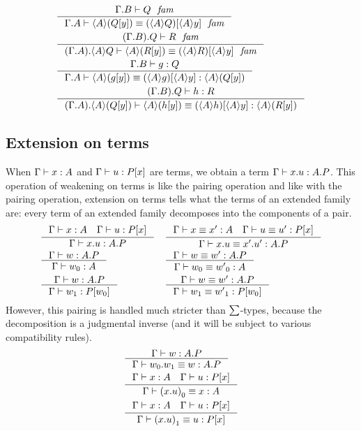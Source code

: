 \begin{align}
& \inference{\jfam{\ctxext{\Gamma}{B}}{Q}}{\jfameq{\ctxext{\Gamma}{A}}{\ctxwk{A}{\subst{y}{Q}}}{\subst{\ctxwk{A}{y}}{\ctxwk{A}{Q}}}}\\
& \inference{\jfam{\ctxext{{\Gamma}{B}}{Q}}{R}}{\jfameq{\ctxext{{\Gamma}{A}}{\ctxwk{A}{Q}}}{\ctxwk{A}{\subst{y}{R}}}{\subst{\ctxwk{A}{y}}{\ctxwk{A}{R}}}}\\
& \inference{\jterm{\ctxext{\Gamma}{B}}{Q}{g}}{\jtermeq{\ctxext{\Gamma}{A}}{\ctxwk{A}{\subst{y}{Q}}}{\ctxwk{A}{\subst{y}{g}}}{\subst{\ctxwk{A}{y}}{\ctxwk{A}{g}}}}\\
& \inference{\jterm{\ctxext{{\Gamma}{B}}{Q}}{R}{h}}{\jtermeq{\ctxext{{\Gamma}{A}}{\ctxwk{A}{\subst{y}{Q}}}}{\ctxwk{A}{\subst{y}{R}}}{\ctxwk{A}{\subst{y}{h}}}{\subst{\ctxwk{A}{y}}{\ctxwk{A}{h}}}}
\end{align}

\subsection{Extension on terms}\label{extension-on-terms}
When $\jterm{\Gamma}{A}{x}$ and $\jterm{\Gamma}{\subst{x}{P}}{u}$ are terms,
we obtain a term $\jterm{\Gamma}{\ctxext{A}{P}}{\ctxext{x}{u}}$. This operation
of weakening on terms is like the pairing operation and like with the pairing
operation, extension on terms tells what the terms of an extended family are:
every term of an extended family decomposes into the components of a pair. 
\begin{align}
& \inference{\jterm{\Gamma}{A}{x}\quad\jterm{\Gamma}{\subst{x}{P}}{u}}{\jterm{\Gamma}{\ctxext{A}{P}}{\ctxext{x}{u}}}
& & \inference{\jtermeq{\Gamma}{A}{x}{x'}\quad\jtermeq{\Gamma}{\subst{x}{P}}{u}{u'}}{\jtermeq{\Gamma}{\ctxext{A}{P}}{\ctxext{x}{u}}{\ctxext{x'}{u'}}}\\
& \inference{\jterm{\Gamma}{\ctxext{A}{P}}{w}}{\jterm{\Gamma}{A}{\pts{w}}}
& & \inference{\jtermeq{\Gamma}{\ctxext{A}{P}}{w}{w'}}{\jtermeq{\Gamma}{A}{\pts{w}}{\pts{w'}}}\\
& \inference{\jterm{\Gamma}{\ctxext{A}{P}}{w}}{\jterm{\Gamma}{\subst{\pts{w}}{P}}{\edg{w}}}
& & \inference{\jtermeq{\Gamma}{\ctxext{A}{P}}{w}{w'}}{\jtermeq{\Gamma}{\subst{\pts{w}}{P}}{\edg{w}}{\edg{w'}}}
\end{align}
However, this pairing is handled
much stricter than $\textstyle\sum$-types, 
because the decomposition is a judgmental inverse (and it will be subject to various compatibility
rules).
\begin{align}
& \inference{\jterm{\Gamma}{\ctxext{A}{P}}{w}}{\jtermeq{\Gamma}{\ctxext{A}{P}}{\ctxext{\pts{w}}{\edg{w}}}{w}}\\
& \inference{\jterm{\Gamma}{A}{x}\quad\jterm{\Gamma}{\subst{x}{P}}{u}}{\jtermeq{\Gamma}{A}{\pts{(\ctxext{x}{u})}}{x}}\\
& \inference{\jterm{\Gamma}{A}{x}\quad\jterm{\Gamma}{\subst{x}{P}}{u}}{\jtermeq{\Gamma}{\subst{x}{P}}{\edg{(\ctxext{x}{u})}}{u}}
\end{align}

